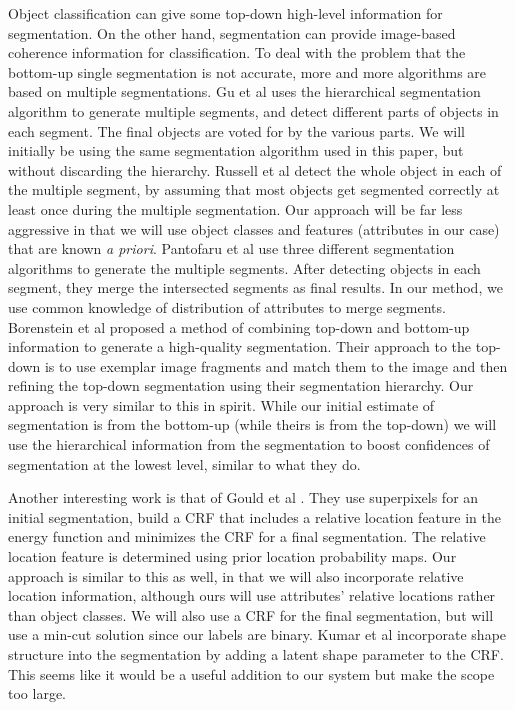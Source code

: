 \documentclass[10pt,twocolumn,letterpaper]{article}
\begin{document}
Object classification can give some top-down high-level information
for segmentation. On the other hand, segmentation can provide
image-based coherence information for classification. To deal with
the problem that the bottom-up single segmentation is not accurate,
more and more algorithms are based on multiple segmentations. Gu et
al \cite{gu09} uses the hierarchical segmentation algorithm to
generate multiple segments, and detect different parts of objects in
each segment. The final objects are voted for by the various parts.
We will initially be using the same segmentation algorithm used in
this paper, but without discarding the hierarchy.
Russell et al \cite{russell06} detect the whole object in each of
the multiple segment, by assuming that most objects get segmented
correctly at least once during the multiple segmentation. Our approach
will be far less aggressive in that we will use object classes and
features (attributes in our case) that are known \emph{a priori}.
Pantofaru et
al \cite{pantofaru} use three different segmentation algorithms to
generate the multiple segments. After detecting objects in each
segment, they merge the intersected segments as final results. In
our method, we use common knowledge of distribution of attributes to
merge segments.
Borenstein et al \cite{borenstein04} proposed a method of combining top-down
and bottom-up information to generate a high-quality segmentation.  Their
approach to the top-down is to use exemplar image fragments and match them
to the image and then refining the top-down segmentation using their
segmentation hierarchy.  Our approach is very similar to this in spirit.
While our initial estimate of segmentation is from the bottom-up (while
theirs is from the top-down) we will use the hierarchical information
from the segmentation to boost confidences of segmentation at the lowest
level, similar to what they do.

Another interesting work is that of Gould et al \cite{gould08}.  They use
superpixels for an initial segmentation, build a CRF that includes a
relative location feature in the energy function and minimizes the CRF
for a final segmentation.  The relative location feature is determined
using prior location probability maps.  Our approach is similar to this
as well, in that we will also incorporate relative location information,
although ours will use attributes' relative locations rather than object
classes.  We will also use a CRF for the final segmentation, but will
use a min-cut solution since our labels are binary.
Kumar et al \cite{kumar05} incorporate shape structure into the segmentation by
adding a latent shape parameter to the CRF.  This seems like it would be
a useful addition to our system but make the scope too large.
\end{document}
